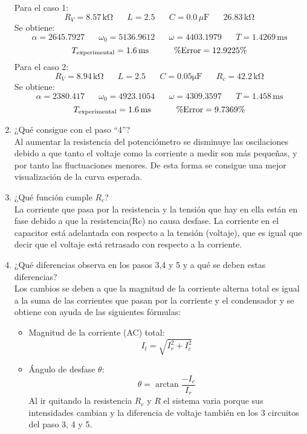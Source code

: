 \documentclass[a4paper,12pt]{report}
\begin{document}
\begin{enumerate}
$$$$
Para el caso 1:
$$
R_{V} = 8.57\,\mathrm{k\Omega} \hspace{20pt} L=2.5 \hspace{20pt} C = 0.0\,\mu\mathrm{F} \hspace{20pt} 26.83\,\mathrm{k\Omega}
$$
Se obtiene:
$$
\alpha = 2645.7927 \hspace{20pt} \omega_{0} = 5136.9612 \hspace{20pt} \omega = 4403.1979 \hspace{20pt} T = 1.4269\,\mathrm{ms}
$$
$$
T_{\mathrm{experimental}} = 1.6\,\mathrm{ms} \hspace*{30pt} \%\mathrm{Error} = 12.9225\%
$$
Para el caso 2:
$$
R_{V} = 8.94\,\mathrm{k\Omega} \hspace{20pt}  L =2.5 \hspace{20pt} C = 0.05\mathrm{\mu F} \hspace{20pt} R_{c} = 42.2\,\mathrm{k\Omega}
$$
Se obtiene:
$$
\alpha = 2380.417 \hspace{20pt} \omega_{0} = 4923.1054 \hspace{20pt} \omega = 4309.3597 \hspace{20pt} T = 1.458\,\mathrm{ms}
$$
$$
T_{\mathrm{experimental}} = 1.6\,\mathrm{ms} \hspace*{30pt} \%\mathrm{Error} = 9.7369\%
$$
\item ¿Qué consigue con el paso ``4''?\\
Al aumentar la resistencia del potenciómetro se disminuye las oscilaciones debido a que tanto el voltaje como la corriente a medir son más pequeñas, y por tanto las fluctuaciones menores. De esta forma se consigue una mejor visualización de la curva esperada.
\item ¿Qué función cumple $R_{c}$?\\
La corriente que pasa por la resistencia y la tensión que hay en ella están en fase debido a que la resistencia(Rc) no causa desfase. La corriente en el capacitor está adelantada con respecto a la tensión (voltaje), que es igual que decir que el voltaje está retrasado con respecto a la corriente.
\item ¿Qué diferencias observa en los pasos 3,4 y 5 y a qué se deben estas diferencias?\\
Los cambios se deben a que la magnitud de la corriente alterna total es igual a la suma de las corrientes que pasan por la corriente y el condensador y se obtiene con ayuda de las siguientes fórmulas:
\begin{itemize}
\item Magnitud de la corriente (AC) total:
$$
I_{t} =  \sqrt{I_{r}^{2} + I_{c}^{2}}
$$
\item Ángulo de desfase $\theta$:
$$
\theta = \arctan \frac{-I_{c}}{I_{r}}
$$
Al ir quitando la resistencia $R_{c}$ y $R$ el sistema varia porque sus intensidades cambian y la diferencia de voltaje también en los 3 circuitos del paso 3, 4 y 5.
\end{itemize}
\end{enumerate}
\end{document}

